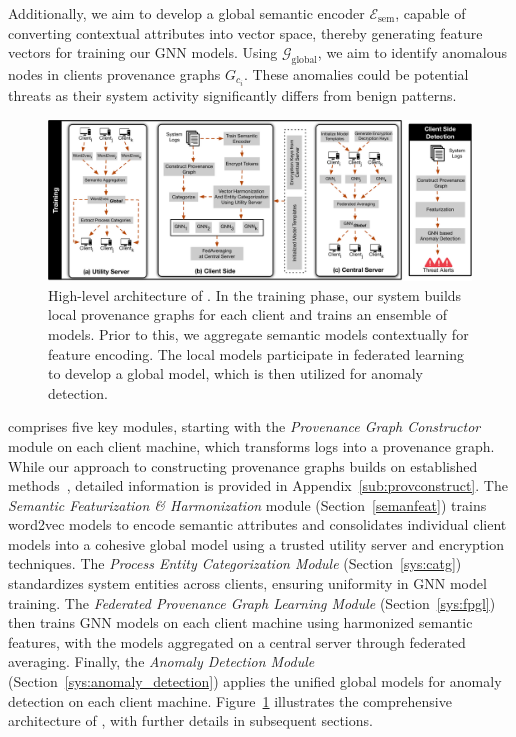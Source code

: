Additionally, we aim to develop a global semantic encoder \( \mathcal{E}_{\text{sem}} \), capable of converting contextual attributes into vector space, thereby generating feature vectors for training our GNN models. Using \( \mathcal{G}_{\text{global}} \), we aim to identify anomalous nodes in clients provenance graphs \( G_{c_i}\). These anomalies could be potential threats as their system activity significantly differs from benign patterns.

\begin{figure}[t!]
  \centering
  \includegraphics[width=1\textwidth]{fig/archv3.pdf}
  \caption{High-level architecture of \Sys. In the training phase, our system builds local provenance graphs for each client and trains an ensemble of \gnnshort models. Prior to this, we aggregate semantic models contextually for feature encoding. The local \gnnshort models participate in federated learning to develop a global \gnnshort model, which is then utilized for anomaly detection. }
  \vspace{-3ex}
  \label{fig:arch}
\end{figure}

\Sys comprises five key modules, starting with the \textit{Provenance Graph Constructor} module on each client machine, which transforms logs into a provenance graph. While our approach to constructing provenance graphs builds on established methods~\cite{inam2023sok,nodoze2019,mpi+ma,loggc,lpm2015,hossain2017sleuth}, detailed information is provided in Appendix~\ref{sub:provconstruct}. The \textit{Semantic Featurization \& Harmonization} module (Section~\ref{semanfeat}) trains word2vec models to encode semantic attributes and consolidates individual client models into a cohesive global model using a trusted utility server and encryption techniques. The \textit{Process Entity Categorization Module} (Section~\ref{sys:catg}) standardizes system entities across clients, ensuring uniformity in GNN model training. The \textit{Federated Provenance Graph Learning Module} (Section~\ref{sys:fpgl}) then trains GNN models on each client machine using harmonized semantic features, with the models aggregated on a central server through federated averaging. Finally, the \textit{Anomaly Detection Module} (Section~\ref{sys:anomaly_detection}) applies the unified global models for anomaly detection on each client machine. Figure~\ref{fig:arch} illustrates the comprehensive architecture of \Sys, with further details in subsequent sections.
  
